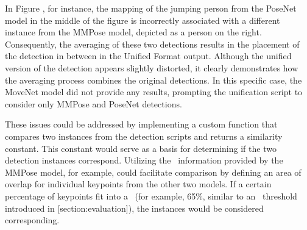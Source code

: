 In Figure , for instance, the mapping of the jumping person from the PoseNet model in the middle of the figure is incorrectly associated with a different instance from the MMPose model, depicted as a person on the right. Consequently, the averaging of these two detections results in the placement of the detection in between in the Unified Format output. Although the unified version of the detection appears slightly distorted, it clearly demonstrates how the averaging process combines the original detections. In this specific case, the MoveNet model did not provide any results, prompting the unification script to consider only MMPose and PoseNet detections.

These issues could be addressed by implementing a custom function that compares two instances from the detection scripts and returns a similarity constant. This constant would serve as a basis for determining if the two detection instances correspond. Utilizing the \BBOX\ information provided by the MMPose model, for example, could facilitate comparison by defining an area of overlap for individual keypoints from the other two models. If a certain percentage of keypoints fit into a \BBOX\ (for example, 65\%, similar to an \IoU\ threshold introduced in [section:evaluation]), the instances would be considered corresponding.
